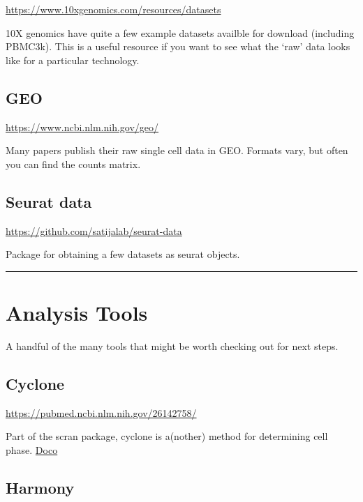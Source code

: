 \documentclass[
]{book}
\begin{document}
\url{https://www.10xgenomics.com/resources/datasets}

10X genomics have quite a few example datasets availble for download (including PBMC3k).
This is a useful resource if you want to see what the `raw' data looks like for a particular technology.

\hypertarget{geo}{%
\subsection*{GEO}\label{geo}}

\url{https://www.ncbi.nlm.nih.gov/geo/}

Many papers publish their raw single cell data in GEO. Formats vary, but often you can find the counts matrix.

\hypertarget{seurat-data}{%
\subsection*{Seurat data}\label{seurat-data}}

\url{https://github.com/satijalab/seurat-data}

Package for obtaining a few datasets as seurat objects.

\begin{center}\rule{0.5\linewidth}{0.5pt}\end{center}

\hypertarget{analysis-tools}{%
\section{Analysis Tools}\label{analysis-tools}}

A handful of the many tools that might be worth checking out for next steps.

\hypertarget{cyclone}{%
\subsection*{Cyclone}\label{cyclone}}

\url{https://pubmed.ncbi.nlm.nih.gov/26142758/}

Part of the scran package, cyclone is a(nother) method for determining cell phase.
\href{https://rdrr.io/bioc/scran/man/cyclone.html}{Doco}

\hypertarget{harmony}{%
\subsection*{Harmony}\label{harmony}}
\end{document}
